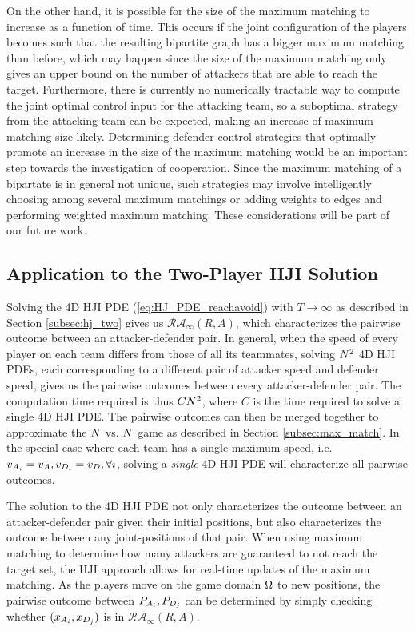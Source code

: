 On the other hand, it is possible for the size of the maximum matching to increase as a function of time. This occurs if the joint configuration of the players becomes such that the resulting bipartite graph has a bigger maximum matching than before, which may happen since the size of the maximum matching only gives an upper bound on the number of attackers that are able to reach the target. Furthermore, there is currently no numerically tractable way to compute the joint optimal control input for the attacking team, so a suboptimal strategy from the attacking team can be expected, making an increase of maximum matching size likely. Determining defender control strategies that optimally promote an increase in the size of the maximum matching would be an important step towards the investigation of cooperation. Since the maximum matching of a bipartate is in general not unique, such strategies may involve intelligently choosing among several maximum matchings or adding weights to edges and performing weighted maximum matching. These considerations will be part of our future work.

\subsection{Application to the Two-Player HJI Solution}
\label{subusec:MMHJI}
Solving the 4D HJI PDE (\ref{eq:HJ_PDE_reachavoid}) with $T\rightarrow \infty$ as described in Section \ref{subsec:hj_two} gives us $\mathcal{RA}_\infty(R,A)$, which characterizes the pairwise outcome between an attacker-defender pair. In general, when the speed of every player on each team differs from those of all its teammates, solving $N^2$ 4D HJI PDEs, each corresponding to a different pair of attacker speed and defender speed, gives us the pairwise outcomes between every attacker-defender pair. The computation time required is thus $C N^2$, where $C$ is the time required to solve a single 4D HJI PDE. The pairwise outcomes can then be merged together to approximate the $N$ vs. $N$ game as described in Section \ref{subsec:max_match}. In the special case where each team has a single maximum speed, i.e. $v_{A_{i}} = v_A, v_{D_{i}} = v_D, \forall i$, solving a \textit{single} 4D HJI PDE will characterize all pairwise outcomes.

The solution to the 4D HJI PDE not only characterizes the outcome between an attacker-defender pair given their initial positions, but also characterizes the outcome between any joint-positions of that pair. When using maximum matching to determine how many attackers are guaranteed to not reach the target set, the HJI approach allows for real-time updates of the maximum matching. As the players move on the game domain $\Omega$ to new positions, the pairwise outcome between $P_{A_{i}},P_{D_{j}}$ can be determined by simply checking whether $(x_{A_{i}}, x_{D_{j}})$ is in $\mathcal{RA}_\infty(R,A)$.

